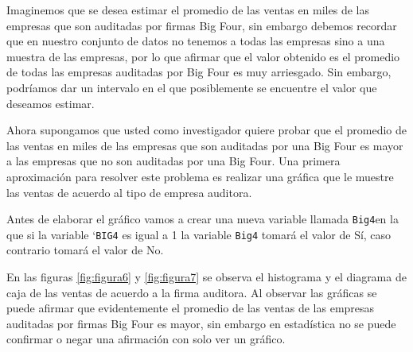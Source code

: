 \documentclass[]{book}
\newenvironment{Shaded}{\begin{snugshade}}{\end{snugshade}}
\newcommand{\DataTypeTok}[1]{\textcolor[rgb]{0.13,0.29,0.53}{#1}}
\newcommand{\DecValTok}[1]{\textcolor[rgb]{0.00,0.00,0.81}{#1}}
\newcommand{\KeywordTok}[1]{\textcolor[rgb]{0.13,0.29,0.53}{\textbf{#1}}}
\newcommand{\NormalTok}[1]{#1}
\newcommand{\OperatorTok}[1]{\textcolor[rgb]{0.81,0.36,0.00}{\textbf{#1}}}
\newcommand{\StringTok}[1]{\textcolor[rgb]{0.31,0.60,0.02}{#1}}
\begin{document}
Imaginemos que se desea estimar el promedio de las ventas en miles de las empresas que son auditadas por firmas Big Four, sin embargo debemos recordar que en nuestro conjunto de datos no tenemos a todas las empresas sino a una muestra de las empresas, por lo que afirmar que el valor obtenido es el promedio de todas las empresas auditadas por Big Four es muy arriesgado. Sin embargo, podríamos dar un intervalo en el que posiblemente se encuentre el valor que deseamos estimar.

Ahora supongamos que usted como investigador quiere probar que el promedio de las ventas en miles de las empresas que son auditadas por una Big Four es mayor a las empresas que no son auditadas por una Big Four. Una primera aproximación para resolver este problema es realizar una gráfica que le muestre las ventas de acuerdo al tipo de empresa auditora.

Antes de elaborar el gráfico vamos a crear una nueva variable llamada \texttt{Big4}en la que si la variable `\texttt{BIG4} es igual a 1 la variable \texttt{Big4} tomará el valor de Sí, caso contrario tomará el valor de No.~

\begin{Shaded}
\end{Shaded}

En las figuras \ref{fig:figura6} y \ref{fig:figura7} se observa el histograma y el diagrama de caja de las ventas de acuerdo a la firma auditora. Al observar las gráficas se puede afirmar que evidentemente el promedio de las ventas de las empresas auditadas por firmas Big Four es mayor, sin embargo en estadística no se puede confirmar o negar una afirmación con solo ver un gráfico.
\end{document}
